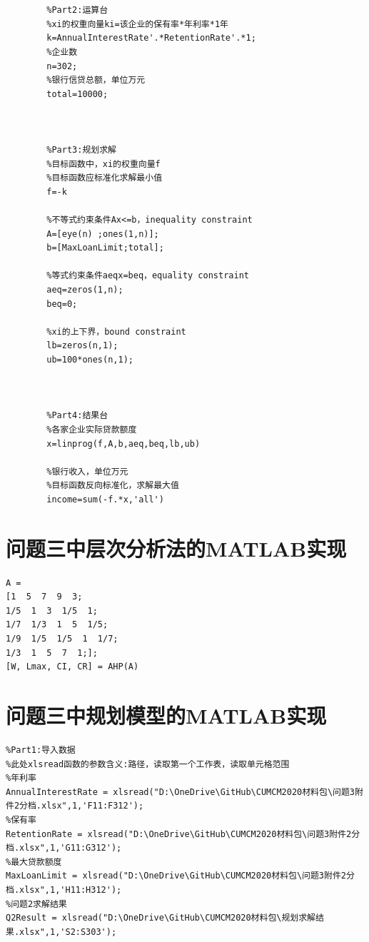 \begin{appendices}
\begin{tcolorbox}[breakable]
\begin{verbatim}
		
		
		%Part2:运算台
		%xi的权重向量ki=该企业的保有率*年利率*1年
		k=AnnualInterestRate'.*RetentionRate'.*1;
		%企业数
		n=302;
		%银行信贷总额，单位万元
		total=10000;
		
		
		
		%Part3:规划求解
		%目标函数中，xi的权重向量f
		%目标函数应标准化求解最小值
		f=-k
		
		%不等式约束条件Ax<=b，inequality constraint
		A=[eye(n) ;ones(1,n)];
		b=[MaxLoanLimit;total];
		
		%等式约束条件aeqx=beq，equality constraint
		aeq=zeros(1,n);
		beq=0;
		
		%xi的上下界，bound constraint
		lb=zeros(n,1);
		ub=100*ones(n,1);
		
		
		
		%Part4:结果台
		%各家企业实际贷款额度
		x=linprog(f,A,b,aeq,beq,lb,ub)
		
		%银行收入，单位万元
		%目标函数反向标准化，求解最大值
		income=sum(-f.*x,'all')
	\end{verbatim}
	\end{tcolorbox}


	\section{问题三中层次分析法的MATLAB实现}
	\begin{tcolorbox}[breakable]
		\begin{verbatim}
A = 
[1  5  7  9  3;
1/5  1  3  1/5  1;
1/7  1/3  1  5  1/5;
1/9  1/5  1/5  1  1/7;
1/3  1  5  7  1;];
[W, Lmax, CI, CR] = AHP(A)
	\end{verbatim}
	\end{tcolorbox}

	\section{问题三中规划模型的MATLAB实现}
	\begin{tcolorbox}[breakable]
		\begin{verbatim}
%Part1:导入数据
%此处xlsread函数的参数含义:路径，读取第一个工作表，读取单元格范围
%年利率
AnnualInterestRate = xlsread("D:\OneDrive\GitHub\CUMCM2020材料包\问题3附件2分档.xlsx",1,'F11:F312');
%保有率
RetentionRate = xlsread("D:\OneDrive\GitHub\CUMCM2020材料包\问题3附件2分档.xlsx",1,'G11:G312');
%最大贷款额度
MaxLoanLimit = xlsread("D:\OneDrive\GitHub\CUMCM2020材料包\问题3附件2分档.xlsx",1,'H11:H312');
%问题2求解结果
Q2Result = xlsread("D:\OneDrive\GitHub\CUMCM2020材料包\规划求解结果.xlsx",1,'S2:S303');




\end{verbatim}
\end{tcolorbox}
\end{appendices}

